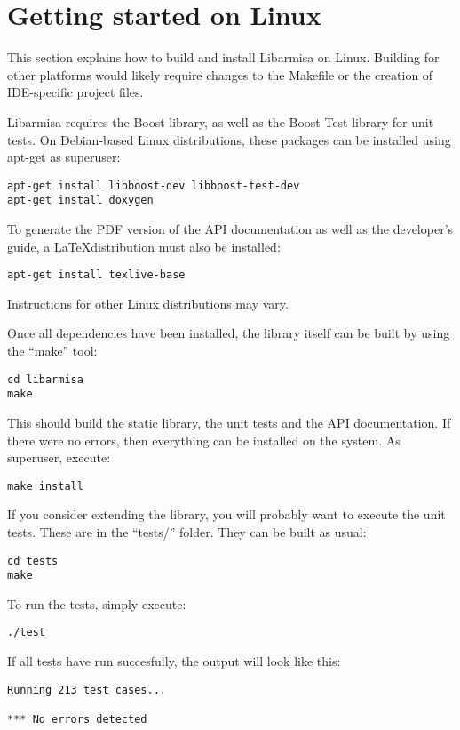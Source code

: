 \documentclass[letterpaper,12pt]{article}
\begin{document}

\section{Getting started on Linux}
\label{sec:getstarted}

This section explains how to build and install Libarmisa on
Linux. Building for other platforms would likely require changes to
the Makefile or the creation of IDE-specific project files.


Libarmisa requires the Boost library, as well as the Boost Test
library for unit tests. On Debian-based Linux distributions, these
packages can be installed using apt-get as superuser:
\begin{verbatim}
apt-get install libboost-dev libboost-test-dev
apt-get install doxygen
\end{verbatim}

To generate the PDF version of the API documentation as well as the
developer's guide, a \LaTeX distribution must also be installed:
\begin{verbatim}
apt-get install texlive-base
\end{verbatim}

Instructions for other Linux distributions may vary.

Once all dependencies have been installed, the library itself can be
built by using the ``make'' tool:
\begin{verbatim}
cd libarmisa
make
\end{verbatim}

This should build the static library, the unit tests and the API
documentation. If there were no errors, then everything can be
installed on the system. As superuser, execute:
\begin{verbatim}
make install
\end{verbatim}

If you consider extending the library, you will probably want to
execute the unit tests. These are in the ``tests/'' folder. They can
be built as usual:
\begin{verbatim}
cd tests
make
\end{verbatim}

To run the tests, simply execute:
\begin{verbatim}
./test
\end{verbatim}

If all tests have run succesfully, the output will look like this:
\begin{verbatim}
Running 213 test cases...

*** No errors detected
\end{verbatim}
\end{document}
